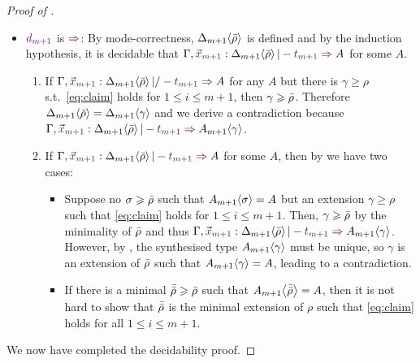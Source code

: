 \begin{proof}[Proof of {}]
\begin{itemize}
\begin{claimproof}
\begin{enumerate}
\begin{enumerate}
\begin{itemize}
                  \item $\dir{d_{m+1}}$ is $\syn$: By mode-correctness, ${\Delta_{m+1}}\!\left<{\bar{\rho}}\right>$ is defined and by the induction hypothesis, it is decidable that $\Gamma, \vars{x}_\isTerm{m+1} : \simsub{\Delta_{m+1}}{\ext{\rho}} |- \isTerm{t_{m+1}} \syn A$ for some $A$.
                    \begin{enumerate}
                      \item If $\Gamma, \vars{x}_\isTerm{m+1} : \simsub{\Delta_{m+1}}{\ext{\rho}} |/- \isTerm{t_{m+1}} \syn A$ for any $A$ but there is $\gamma \geq \rho$ s.t.\ \eqref{eq:claim} holds for $1 \leq i \leq m+1$, then $\gamma \geqslant \bar{\rho}$.
                        Therefore ${\Delta_{m+1}}\!\left<{\bar{\rho}}\right> = {\Delta_{m+1}}\!\left<{\gamma}\right>$ and we derive a contradiction because $\Gamma, \vars{x}_\isTerm{m+1} : \simsub{\Delta_{m+1}}{\ext{\rho}} |- \isTerm{t_{m+1}} \syn \simsub{A_{m+1}}{\gamma}$.
                      \item If $\Gamma, \vars{x}_\isTerm{m+1} : \simsub{\Delta_{m+1}}{\ext{\rho}} |- \isTerm{t_{m+1}} \syn A$ for some $A$, then by  we have two cases: %
                        \begin{itemize}
                          \item Suppose no $\sigma \geqslant \bar{\rho}$ such that ${A_{m+1}}\!\left<{\sigma}\right> = A$ but an extension $\gamma \geq \rho$ such that \eqref{eq:claim} holds for $1 \leq i \leq m + 1$. 
                            Then, $\gamma \geqslant \bar{\rho}$ by the minimality of $\bar{\rho}$ and thus
                            $\Gamma, \vars{x}_\isTerm{m+1} : \simsub{\Delta_{m+1}}{\ext{\rho}} |- \isTerm{t_{m+1}} \syn \simsub{A_{m+1}}{\gamma}$.
                            However, by , the synthesised type ${A_{m+1}}\!\left<{\gamma}\right>$ must be unique, so $\gamma$ is an extension of $\bar{\rho}$ such that ${A_{m+1}}\!\left<{\gamma}\right> = A$, leading to a contradiction.
                          \item If there is a minimal $\bar{\bar{\rho}} \geqslant \bar{\rho}$ such that ${A_{m+1}}\!\left<{\bar{\bar{\rho}}}\right> = A$, then it is not hard to show that $\bar{\bar{\rho}}$ is the minimal extension of $\rho$ such that \eqref{eq:claim} holds for all $1 \leq i \leq m + 1$.
                        \end{itemize}
                    \end{enumerate}
                \end{itemize}
            \end{enumerate}
        \end{enumerate}
      \end{claimproof}
  \end{itemize}
  We now have completed the decidability proof.
\end{proof}

